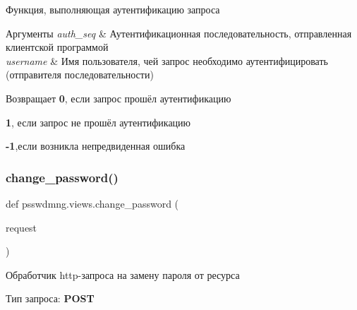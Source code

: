 Функция, выполняющая аутентификацию запроса ~\newline
 


\begin{DoxyParams}{Аргументы}
{\em auth\+\_\+seq} & Аутентификационная последовательность, отправленная клиентской программой \\
\hline
{\em username} & Имя пользователя, чей запрос необходимо аутентифицировать (отправителя последовательности) \\
\hline
\end{DoxyParams}
\begin{DoxyReturn}{Возвращает}
{\bfseries 0}, если запрос прошёл аутентификацию 

{\bfseries 1}, если запрос не прошёл аутентификацию 

{\bfseries -\/1},если возникла непредвиденная ошибка 
\end{DoxyReturn}
\mbox{\label{namespacepsswdmng_1_1views_a2a0f4820fa5b24534e02581bacc53617}} 
\subsubsection{change\+\_\+password()}
{\footnotesize\ttfamily def psswdmng.\+views.\+change\+\_\+password (\begin{DoxyParamCaption}\item[{}]{request }\end{DoxyParamCaption})}



Обработчик http-\/запроса на замену пароля от ресурса 

Тип запроса\+: {\bfseries P\+O\+ST} 

